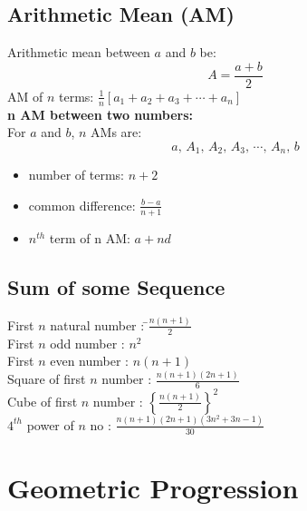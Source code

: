 \documentclass[11pt,a4paper,landscape]{article}
\begin{document}
\begin{multicols*}{3}
	
	
	
	
	\subsection{Arithmetic Mean (AM)}
	Arithmetic mean between $a$ and $b$ be:
	$$A=\frac{a+b}{2}$$
	AM of $n$ terms: $\frac{1}{n}[a_1+a_2+a_3+\cdots+a_n]$\\
	\textbf{n AM between two numbers:}\\
	For $a$ and $b$, $n$ AMs are:
	$$a,\,A_1,\,A_2,\,A_3,\,\cdots,\,A_n,\,b$$
	\begin{itemize}
	\item number of terms: $n+2$
	\item common difference: $\frac{b-a}{n+1}$
	\item $n^{th}$ term of n AM: $a+nd$
	\end{itemize}
	\subsection{Sum of some Sequence}
	\begin{tabbing}
	First $n$ natural number : \hspace{2mm}\=$\frac{n(n+1)}{2}$\\[3mm] 
	First $n$ odd number : \> $n^2$\\[3mm]
	First $n$ even number : \> $n(n+1)$\\[3mm]
	Square of first $n$ number : \> $\frac{n(n+1)(2n+1)}{6}$\\
	Cube of first $n$ number : \> ${\left \{ \frac{n(n+1)}{2} \right \} }^2$\\[3mm]
	$4^{th}$ power of $n$ no : $\frac{n(n+1)(2n+1)(3n^{2}+3n-1)}{30}$ \> 
	\end{tabbing}
\section{Geometric Progression}

\end{multicols*}
\end{document}
